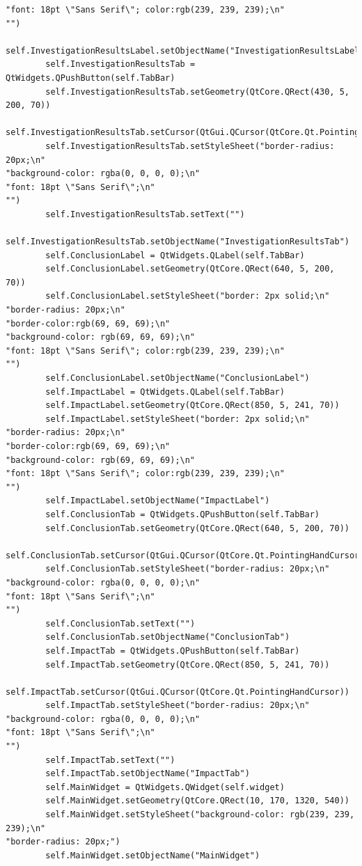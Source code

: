 \documentclass{article}
\begin{document}
\begin{lstlisting}
"font: 18pt \"Sans Serif\"; color:rgb(239, 239, 239);\n"
"")
        self.InvestigationResultsLabel.setObjectName("InvestigationResultsLabel")
        self.InvestigationResultsTab = QtWidgets.QPushButton(self.TabBar)
        self.InvestigationResultsTab.setGeometry(QtCore.QRect(430, 5, 200, 70))
        self.InvestigationResultsTab.setCursor(QtGui.QCursor(QtCore.Qt.PointingHandCursor))
        self.InvestigationResultsTab.setStyleSheet("border-radius: 20px;\n"
"background-color: rgba(0, 0, 0, 0);\n"
"font: 18pt \"Sans Serif\";\n"
"")
        self.InvestigationResultsTab.setText("")
        self.InvestigationResultsTab.setObjectName("InvestigationResultsTab")
        self.ConclusionLabel = QtWidgets.QLabel(self.TabBar)
        self.ConclusionLabel.setGeometry(QtCore.QRect(640, 5, 200, 70))
        self.ConclusionLabel.setStyleSheet("border: 2px solid;\n"
"border-radius: 20px;\n"
"border-color:rgb(69, 69, 69);\n"
"background-color: rgb(69, 69, 69);\n"
"font: 18pt \"Sans Serif\"; color:rgb(239, 239, 239);\n"
"")
        self.ConclusionLabel.setObjectName("ConclusionLabel")
        self.ImpactLabel = QtWidgets.QLabel(self.TabBar)
        self.ImpactLabel.setGeometry(QtCore.QRect(850, 5, 241, 70))
        self.ImpactLabel.setStyleSheet("border: 2px solid;\n"
"border-radius: 20px;\n"
"border-color:rgb(69, 69, 69);\n"
"background-color: rgb(69, 69, 69);\n"
"font: 18pt \"Sans Serif\"; color:rgb(239, 239, 239);\n"
"")
        self.ImpactLabel.setObjectName("ImpactLabel")
        self.ConclusionTab = QtWidgets.QPushButton(self.TabBar)
        self.ConclusionTab.setGeometry(QtCore.QRect(640, 5, 200, 70))
        self.ConclusionTab.setCursor(QtGui.QCursor(QtCore.Qt.PointingHandCursor))
        self.ConclusionTab.setStyleSheet("border-radius: 20px;\n"
"background-color: rgba(0, 0, 0, 0);\n"
"font: 18pt \"Sans Serif\";\n"
"")
        self.ConclusionTab.setText("")
        self.ConclusionTab.setObjectName("ConclusionTab")
        self.ImpactTab = QtWidgets.QPushButton(self.TabBar)
        self.ImpactTab.setGeometry(QtCore.QRect(850, 5, 241, 70))
        self.ImpactTab.setCursor(QtGui.QCursor(QtCore.Qt.PointingHandCursor))
        self.ImpactTab.setStyleSheet("border-radius: 20px;\n"
"background-color: rgba(0, 0, 0, 0);\n"
"font: 18pt \"Sans Serif\";\n"
"")
        self.ImpactTab.setText("")
        self.ImpactTab.setObjectName("ImpactTab")
        self.MainWidget = QtWidgets.QWidget(self.widget)
        self.MainWidget.setGeometry(QtCore.QRect(10, 170, 1320, 540))
        self.MainWidget.setStyleSheet("background-color: rgb(239, 239, 239);\n"
"border-radius: 20px;")
        self.MainWidget.setObjectName("MainWidget")

\end{lstlisting}
\end{document}
